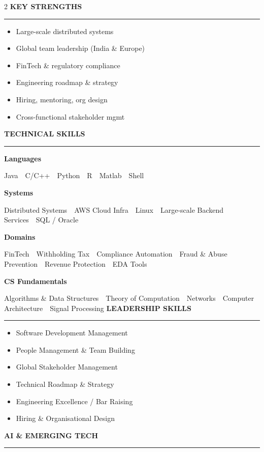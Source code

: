 \documentclass[10pt,a4paper]{article}
\newcommand{\cvsection}[1]{%
  \vspace{8pt}%
  {\normalsize\bfseries\color{textdark}\MakeUppercase{#1}}\par
  \vspace{1pt}%
  {\color{accent}\rule{\linewidth}{1pt}}\par
  \vspace{3pt}%
}
\begin{document}
\begin{paracol}{2}
\switchcolumn
\cvsection{Key Strengths}
\small
\begin{itemize}
  \item Large-scale distributed systems
  \item Global team leadership (India \& Europe)
  \item FinTech \& regulatory compliance
  \item Engineering roadmap \& strategy
  \item Hiring, mentoring, org design
  \item Cross-functional stakeholder mgmt
\end{itemize}
\cvsection{Technical Skills}
\small
\textbf{Languages}\par
Java~\textperiodcentered~C/C++~\textperiodcentered~Python~\textperiodcentered~R~\textperiodcentered~Matlab~\textperiodcentered~Shell\par\vspace{3pt}
\textbf{Systems}\par
Distributed Systems~\textperiodcentered~AWS Cloud Infra~\textperiodcentered~Linux~\textperiodcentered~Large-scale Backend Services~\textperiodcentered~SQL / Oracle\par\vspace{3pt}
\textbf{Domains}\par
FinTech~\textperiodcentered~Withholding Tax~\textperiodcentered~Compliance Automation~\textperiodcentered~Fraud \& Abuse Prevention~\textperiodcentered~Revenue Protection~\textperiodcentered~EDA Tools\par\vspace{3pt}
\textbf{CS Fundamentals}\par
Algorithms \& Data Structures~\textperiodcentered~Theory of Computation~\textperiodcentered~Networks~\textperiodcentered~Computer Architecture~\textperiodcentered~Signal Processing
\cvsection{Leadership Skills}
\small
\begin{itemize}
  \item Software Development Management
  \item People Management \& Team Building
  \item Global Stakeholder Management
  \item Technical Roadmap \& Strategy
  \item Engineering Excellence / Bar Raising
  \item Hiring \& Organisational Design
\end{itemize}
\cvsection{AI \& Emerging Tech}
\small
\begin{itemize}

\end{itemize}
\end{paracol}
\end{document}
